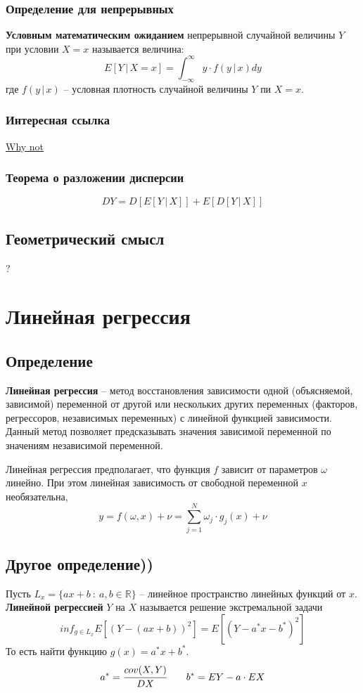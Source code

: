 \documentclass{article}
\newcommand{\R}{\mathbb{R}}
\begin{document}
\subsubsection{Определение для непрерывных}
\textbf{Условным математическим ожиданием} непрерывной случайной величины $Y$ при условии $X=x$ называется величина:
$$ E[Y\,|\,X=x]=\int_{-\infty}^{\infty} y\cdot f(y\,|\,x)dy $$
где $f(y\,|\,x)$ -- условная плотность случайной величины $Y$ пи $X=x$.

\subsubsection{Интересная ссылка}
\href{https://eduardgorbunov.github.io/assets/files/Seminar07_675.pdf}{Why not}
\subsubsection{Теорема о разложении дисперсии}
$$ DY=D[E[Y\,|\,X]]+E[D[Y\,|\,X]] $$
\subsection{Геометрический смысл}
?
\newpage
\section{Линейная регрессия}
\subsection{Определение}
\textbf{Линейная регрессия} -- метод восстановления зависимости одной (объясняемой, зависимой) переменной от другой или нескольких других переменных (факторов, регрессоров, независимых переменных) с линейной функцией зависимости. Данный метод позволяет предсказывать значения зависимой переменной по значениям независимой переменной.

Линейная регрессия предполагает, что функция $f$ зависит от параметров $\omega$ линейно. При этом линейная зависимость от свободной переменной $x$ необязательна,
$$ y=f(\omega,x)+\nu=\sum_{j=1}^N \omega_j\cdot g_j(x)+\nu $$
\subsection{Другое определение))}
Пусть $L_x=\{ax+b\::\:a,b\in\R\}$ -- линейное пространство линейных функций от $x$. \textbf{Линейной регрессией} $Y$ на $X$ называется решение экстремальной задачи $$ inf_{g\in L_x} E[(Y-(ax+b))^2]=E[(Y-a^*x-b^*)^2] $$
То есть найти функцию $g(x)=a^* x+b^*$.
$$ a^*=\cfrac{cov(X,Y)}{DX} \quad\quad b^*=EY-a\cdot EX $$
\newpage
\end{document}
